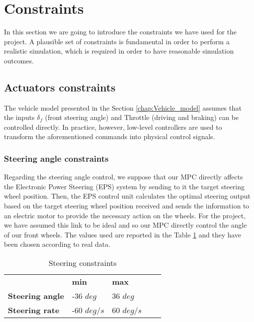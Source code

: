 \section{Constraints}
In this section we are going to introduce the constraints we have used for the project. A plausible set of constraints is fundamental in order to perform a realistic simulation, which is required in order to have reasonable simulation outcomes. 
\subsection{Actuators constraints}

The vehicle model presented in the Section \ref{chap:Vehicle_model} assumes that the inputs $\delta_f$ (front steering angle) and Throttle (driving and braking) can be controlled
directly. In practice, however, low-level controllers are used to transform the aforementioned
commands into physical control signals.
\subsubsection{Steering angle constraints}
Regarding the steering angle control, we suppose that our MPC directly affects the Electronic Power Steering (EPS) system by sending to it the target steering wheel position. Then, the EPS control unit calculates the optimal steering output based on the target steering wheel position received and sends the information to an electric motor to provide the necessary action on the wheels.
For the project, we have assumed this link to be ideal and so our MPC directly control the angle of our front wheels. The values used are reported in the Table \ref{tab:steering} and they have been chosen according to real data\cite{forkenbrock2005assessment}.

\begin{table}[H]
\begin{center}
\begin{tabular}{lllll}
\cline{2-3}
\multicolumn{1}{l|}{}                         & \multicolumn{1}{l|}{\textbf{min}} & \multicolumn{1}{l|}{\textbf{max}} &  &  \\ \cline{1-3}
\multicolumn{1}{|l|}{\textbf{Steering angle}} & \multicolumn{1}{l|}{-36 $deg$}      & \multicolumn{1}{l|}{36 $deg$}      &  &  \\ \cline{1-3}
\multicolumn{1}{|l|}{\textbf{Steering rate}}  & \multicolumn{1}{l|}{-60 $deg/s$}    & \multicolumn{1}{l|}{60 $deg/s$}    &  &  \\ \cline{1-3}
\end{tabular}
\caption{Steering constraints}
\label{tab:steering}

\end{center}
\end{table}

